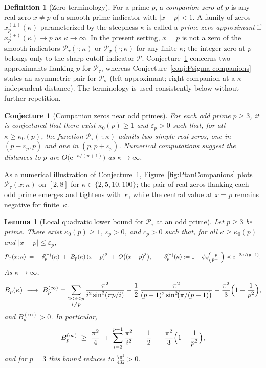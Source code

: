 \documentclass[11pt,a4paper]{amsart}
\theoremstyle{plain}
\newtheorem{conjecture}[theorem]{Conjecture}
\newtheorem{lemma}[theorem]{Lemma}
\theoremstyle{definition}
\newtheorem{definition}[theorem]{Definition}
\theoremstyle{remark}
\begin{document}
\begin{definition}[Zero terminology]\label{def:zero-terminology}
For a prime $p$, a \emph{companion zero at $p$} is any real zero $x\neq p$ of a smooth prime indicator with $|x-p|<1$. A family of zeros $x_p^{(\pm)}(\kappa)$ parameterized by the steepness $\kappa$ is called a \emph{prime-zero approximant} if $x_p^{(\pm)}(\kappa)\to p$ as $\kappa\to\infty$.
In the present setting, $x=p$ is not a zero of the smooth indicators $\mathcal P_\tau(\cdot;\kappa)$ or $\mathcal P_\sigma(\cdot;\kappa)$ for any finite $\kappa$; the integer zero at $p$ belongs only to the sharp-cutoff indicator $\mathcal P$.
Conjecture~\ref{conj:companion-zeros} concerns two approximants flanking $p$ for $\mathcal P_\tau$, whereas Conjecture~\ref{conj:Psigma-companions} states an asymmetric pair for $\mathcal P_\sigma$ (left approximant; right companion at a $\kappa$-independent distance). The terminology is used consistently below without further repetition.
\end{definition}

\begin{conjecture}[Companion zeros near odd primes]\label{conj:companion-zeros}
For each odd prime $p\ge 3$, it is conjectured that there exist $\kappa_0(p)\ge 1$ and $\varepsilon_p>0$ such that, for all $\kappa\ge \kappa_0(p)$, the function $\mathcal P_\tau(\cdot;\kappa)$ admits two simple real zeros, one in $(p-\varepsilon_p,p)$ and one in $(p,p+\varepsilon_p)$. Numerical computations suggest the distances to $p$ are $O\bigl(\mathrm e^{-\kappa/(p+1)}\bigr)$ as $\kappa\to\infty$.
\end{conjecture}

As a numerical illustration of Conjecture~\ref{conj:companion-zeros}, 
Figure~\ref{fig:PtauCompanions} plots $\mathcal P_\tau(x;\kappa)$ on $[2,8]$ for 
$\kappa\in\{2,5,10,100\}$; the pair of real zeros flanking each odd prime emerges and tightens 
with~$\kappa$, while the central value at $x=p$ remains negative for finite~$\kappa$.


\begin{lemma}[Local quadratic lower bound for $\mathcal P_\tau$ at an odd prime]\label{lem:Ptau-local-lb}
Let $p\ge 3$ be prime. There exist $\kappa_0(p)\ge 1$, $\varepsilon_p>0$, and $c_p>0$ such that, for all $\kappa\ge \kappa_0(p)$ and $|x-p|\le \varepsilon_p$,
\[
\mathcal P_\tau(x;\kappa)\;=\;-\delta_p^{(\tau)}(\kappa)\;+\;B_p(\kappa)\,(x-p)^2\;+\;O\bigl((x-p)^3\bigr),
\qquad \delta_p^{(\tau)}(\kappa):=1-\phi_\kappa\!\Bigl(\tfrac{p}{p+1}\Bigr)\asymp \mathrm e^{-2\kappa/(p+1)}.
\]
As $\kappa\to\infty$,
\[
B_p(\kappa)\ \longrightarrow\ B_p^{(\infty)}
=\sum_{\substack{2\le i\le p\\ i\neq p}}\frac{\pi^2}{i^2\sin^2(\pi p/i)}
+\frac{1}{2}\,\frac{\pi^2}{(p+1)^2\sin^2\!\bigl(\pi/(p+1)\bigr)}
-\frac{\pi^2}{3}\Bigl(1-\frac{1}{p^2}\Bigr),
\]
and $B_p^{(\infty)}>0$. In particular,
\[
B_p^{(\infty)} \;\ge\; \frac{\pi^2}{4} \;+\; \sum_{i=3}^{p-1}\frac{\pi^2}{i^2} \;+\; \frac12 \;-\; \frac{\pi^2}{3}\Bigl(1-\frac{1}{p^2}\Bigr),
\]
and for $p=3$ this bound reduces to $ \frac{7\pi^2}{432}>0$.
\end{lemma}
\end{document}
